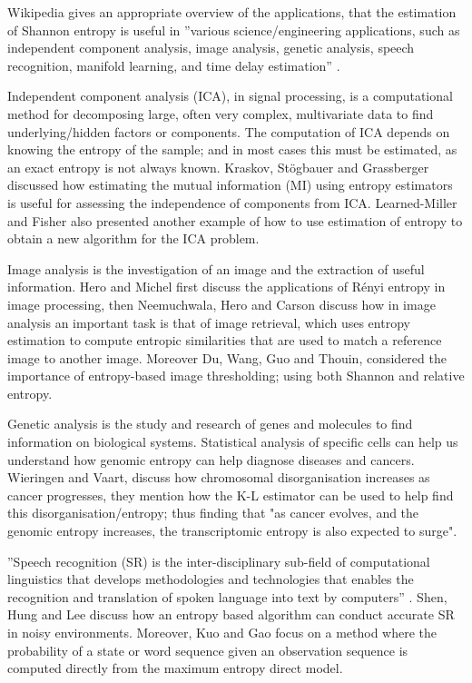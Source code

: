 \documentclass{report}
\begin{document}
Wikipedia gives an appropriate overview of the applications, that the estimation of Shannon entropy is useful in ''various science/engineering applications, such as independent component analysis, image analysis, genetic analysis, speech recognition, manifold learning, and time delay estimation'' \cite{wiki1}.

Independent component analysis (ICA), in signal processing, is a computational method for decomposing large, often very complex, multivariate data to find underlying/hidden factors or components. The computation of ICA depends on knowing the entropy of the sample; and in most cases this must be estimated, as an exact entropy is not always known. Kraskov, St\"{o}gbauer and Grassberger \cite{ICA1} discussed how estimating the mutual information (MI) using entropy estimators is useful for assessing the independence of components from ICA. Learned-Miller and Fisher \cite{ICA2} also presented another example of how to use estimation of entropy to obtain a new algorithm for the ICA problem. 

Image analysis is the investigation of an image and the extraction of useful information. Hero and Michel \cite{IM2} first discuss the applications of R\'enyi entropy in image processing, then Neemuchwala, Hero and Carson \cite{IM1} discuss how in image analysis an important task is that of image retrieval, which uses entropy estimation to compute entropic similarities that are used to match a reference image to another image.  Moreover Du, Wang, Guo and Thouin, \cite{IM3} considered the importance of entropy-based image thresholding; using both Shannon and relative entropy.

Genetic analysis is the study and research of genes and molecules to find information on biological systems. Statistical analysis of specific cells can help us understand how genomic entropy can help diagnose diseases and cancers. Wieringen and Vaart, \cite{gen1} discuss how chromosomal disorganisation increases as cancer progresses, they mention how the K-L estimator can be used to help find this disorganisation/entropy; thus finding that "as cancer evolves, and the genomic entropy increases, the transcriptomic entropy is also expected to surge". 

''Speech recognition (SR) is the inter-disciplinary sub-field of computational linguistics that develops methodologies and technologies that enables the recognition and translation of spoken language into text by computers'' \cite{wiki2}. Shen, Hung and Lee \cite{speech1} discuss how an entropy based algorithm can conduct accurate SR in noisy environments. Moreover, Kuo and Gao \cite{speech2} focus on a method where the probability of a state or word sequence given an observation sequence is computed directly from the maximum entropy direct model.
\end{document}
